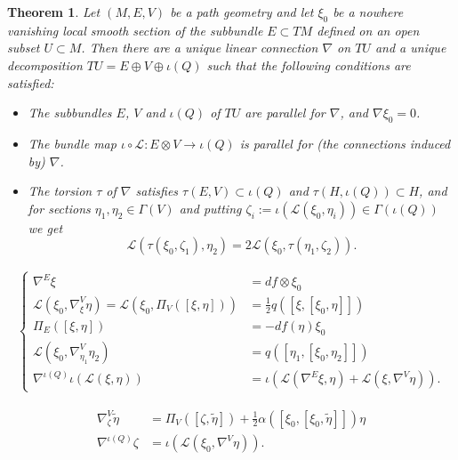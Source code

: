 \documentclass[10pt,a4paper]{amsart}
\newtheorem{theorem}{Theorem}
\begin{document}
\begin{theorem}\label{thm:main}
    Let $(M,E,V)$ be a path geometry and let $\xi_0$ be a nowhere vanishing local smooth section of the subbundle $E\subset TM$ defined on an open subset $U\subset M$. Then there are a unique linear connection $\nabla$ on $TU$ and a unique decomposition $TU=E\oplus V\oplus \iota(Q)$ such that the following conditions are satisfied: 
    \begin{itemize}
        \item[(i)] The subbundles $E$, $V$ and $\iota(Q)$ of $TU$ are parallel for $\nabla$, and $\nabla\xi_0=0$. 
        \item[(ii)] The bundle map $\iota\circ\mathcal L:E\otimes V\to\iota(Q)$ is parallel for (the connections induced by) $\nabla$.
        \item[(iii)] The torsion $\tau$ of $\nabla$ satisfies $\tau(E,V)\subset \iota(Q)$ and $\tau(H,\iota(Q))\subset H$, and for sections $\eta_1,\eta_2\in\Gamma(V)$ and putting $\zeta_i:=\iota(\mathcal L(\xi_0,\eta_i))\in\Gamma(\iota(Q))$ we get 
        \begin{equation}\label{eq:norm}
            \mathcal L(\tau(\xi_0,\zeta_1),\eta_2)=2\mathcal L(\xi_0,\tau(\eta_1,\zeta_2)).
        \end{equation}
    \end{itemize}
\end{theorem}

\begin{equation}\label{homog1-props}
\begin{aligned}
\begin{cases}
\nabla^E\xi&=df\otimes\xi_0\\
\mathcal L(\xi_0,\nabla^V_{\xi}\eta)=\mathcal L(\xi_0,\Pi_V([\xi,\eta]))&=\frac 1 2 q([\xi,[\xi_0,\eta]])\\
\Pi_E([\xi,\eta])&=-df(\eta)\xi_0\\
\mathcal L(\xi_0,\nabla^V_{\eta_1}\eta_2)&=q([\eta_1,[\xi_0,\eta_2]])\\
\nabla^{\iota(Q)}\iota(\mathcal L(\xi,\eta))&=\iota(\mathcal L(\nabla^E\xi,\eta)+\mathcal L(\xi,\nabla^V\eta)).
\end{cases}
\end{aligned}
\end{equation}

    \begin{equation}\label{homog2-props}
    \begin{aligned}
     \nabla^V_{\zeta}\tilde\eta&=\Pi_V([\zeta,\tilde\eta])+\tfrac12\alpha([\xi_0,[\xi_0,\tilde\eta]])\eta\\
     \nabla^{\iota(Q)}\zeta &=\iota(\mathcal L(\xi_0,\nabla^V\eta)).    
    \end{aligned}
    \end{equation}
\end{document}

